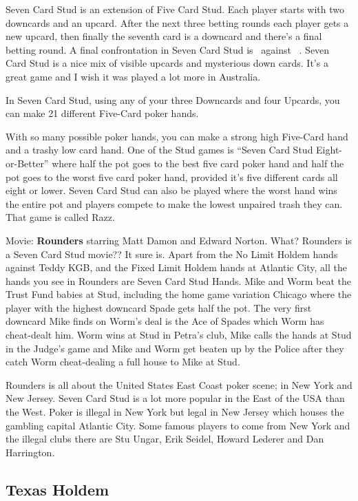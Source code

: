 Seven Card Stud is an extension of Five Card Stud. Each player starts
with two downcards and an upcard. After the next three betting rounds
each player gets a new upcard, then finally the seventh card is a
downcard and there's a final betting round. A final confrontation in
Seven Card Stud is \back\back\nines\Qd\Jd\tred\back\ against
\back\back\fourh\Jh\tend\trec\back\ . Seven Card Stud is a nice mix of
visible upcards and mysterious down cards. It's a great game and I
wish it was played a lot more in Australia.

In Seven Card Stud, using any of your three Downcards and four
Upcards, you can make 21 different Five-Card poker hands.

With so many possible poker hands, you can make a strong high
Five-Card hand and a trashy low card hand. One of the Stud games is
``Seven Card Stud Eight-or-Better'' where half the pot goes to the
best five card poker hand and half the pot goes to the worst five card
poker hand, provided it's five different cards all eight or lower.
Seven Card Stud can also be played where the worst hand wins the
entire pot and players compete to make the lowest unpaired trash they
can. That game is called Razz.

Movie: \textbf{Rounders} starring Matt Damon and Edward Norton.
What? Rounders is a Seven Card Stud movie?? It sure is. Apart from the
No Limit Holdem hands against Teddy KGB, and the Fixed Limit Holdem
hands at Atlantic City, all the hands you see in Rounders are Seven
Card Stud Hands. Mike and Worm beat the Trust Fund babies at Stud,
including the home game variation Chicago where the player with the
highest downcard Spade gets half the pot. The very first downcard Mike
finds on Worm's deal is the Ace of Spades which Worm has cheat-dealt him.
Worm wins at Stud in Petra's club, Mike calls the hands at Stud in
the Judge's game and Mike and Worm get beaten up by the Police after
they catch Worm cheat-dealing a full house to Mike at Stud.

Rounders is all about the United States East Coast poker scene;
in New York and New Jersey. Seven Card Stud is a lot more
popular in the East of the USA than the West. Poker is illegal in
New York but legal in New Jersey which houses the gambling capital
Atlantic City. Some famous players to come from New York and the illegal
clubs there are Stu Ungar, Erik Seidel, Howard Lederer and Dan Harrington.

\subsection{Texas Holdem}

